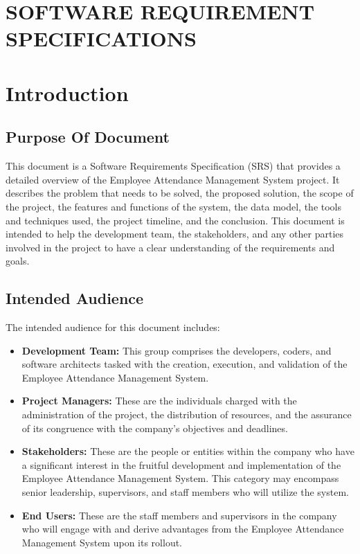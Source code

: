 \documentclass[a4paper, 12pt]{article}
\begin{document}
\tableofcontents
\newpage

\section*{\centering SOFTWARE REQUIREMENT SPECIFICATIONS}

\section{Introduction}

\subsection{Purpose Of Document}
This document is a Software Requirements Specification (SRS) that provides a detailed overview of the Employee Attendance Management System project. It describes the problem that needs to be solved, the proposed solution, the scope of the project, the features and functions of the system, the data model, the tools and techniques used, the project timeline, and the conclusion. This document is intended to help the development team, the stakeholders, and any other parties involved in the project to have a clear understanding of the requirements and goals.

\subsection{Intended Audience}
The intended audience for this document includes:
\begin{itemize}
    \item \textbf{Development Team: }This group comprises the developers, coders, and software architects tasked with the creation, execution, and validation of the Employee Attendance Management System.
    \item \textbf{Project Managers: }These are the individuals charged with the administration of the project, the distribution of resources, and the assurance of its congruence with the company’s objectives and deadlines.
    \item \textbf{Stakeholders: }These are the people or entities within the company who have a significant interest in the fruitful development and implementation of the Employee Attendance Management System. This category may encompass senior leadership, supervisors, and staff members who will utilize the system.
    \item \textbf{End Users: }These are the staff members and supervisors in the company who will engage with and derive advantages from the Employee Attendance Management System upon its rollout.
\end{itemize}
\end{document}
